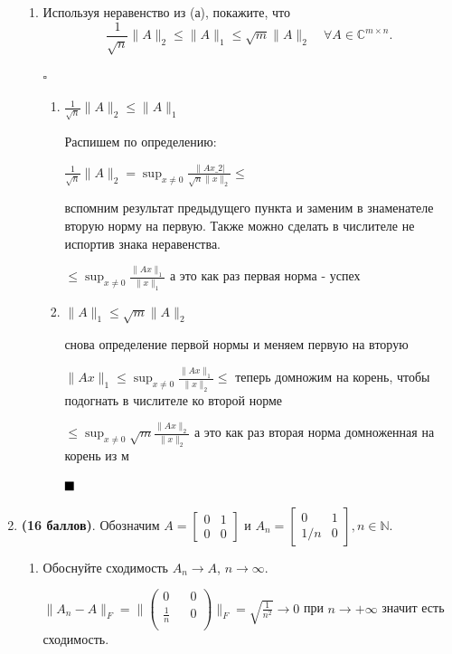 \documentclass[a4paper, 11pt]{article}
\newcommand{\prob}[1]{\item \textbf{(#1 баллов)}.}
\begin{document}
\begin{enumerate}
\begin{enumerate}
			\item Используя неравенство из (а), покажите, что
			\[
			\frac{1}{\sqrt{n}} \|A\|_2 \leq  \|A\|_{1} \leq \sqrt{m} \|A\|_2 \quad \forall A\in\mathbb{C}^{m\times n}.
			\]
			
			$\square$
			
					\begin{enumerate}
						\item $\frac{1}{\sqrt{n}} \|A\|_2 \leq  \|A\|_{1}$
						
							Распишем по определению:
							
								$\frac{1}{\sqrt{n}} \|A\|_2 = \sup_{x \neq 0} \frac{\| Ax\_2|}{\sqrt{n} \| x \|_2} \leqslant $
								
								вспомним результат предыдущего пункта и заменим в знаменателе вторую норму на первую. Также можно сделать в числителе не испортив знака неравенства.
								
								$\leqslant \sup_{x \neq 0} \frac{\| Ax \|_1}{\| x \|_1 } $ а это как раз первая норма - успех
								
						\item $\|A\|_{1} \leq \sqrt{m} \|A\|_2$
						
							снова определение первой нормы и меняем первую на вторую
							
							$\| Ax \|_1 \leqslant \sup_{x \neq 0} \frac{\| Ax \|_1}{\| x \|_2} \leqslant$ теперь домножим на корень, чтобы подогнать в числителе ко второй норме
							
							$\leqslant \sup_{x \neq 0} \sqrt{m} \frac{\| Ax \|_2}{\| x \|_2} $ а это как раз вторая норма домноженная на корень из м
							
						$\hfill \blacksquare$
						
					\end{enumerate}
			
				
		\end{enumerate}
		\prob{16} 
		Обозначим $A = \begin{bmatrix}0 & 1 \\ 0 & 0 \end{bmatrix}$ и $A_n = \begin{bmatrix} 0 & 1 \\ 1/n & 0 \end{bmatrix}, n\in\mathbb{N}$.
		\begin{enumerate}
			\item Обоснуйте сходимость $A_n\to A$, $n\to\infty$.
				
				$\|A_n - A\|_F = \|\begin{pmatrix}
					0 && 0 \\
					\frac{1}{n} && 0 \\
				\end{pmatrix}\|_F = \sqrt{\frac{1}{n^2}} \to 0$  при $n \to +\infty$ значит есть сходимость.
			

\end{enumerate}
\end{enumerate}
\end{document}
